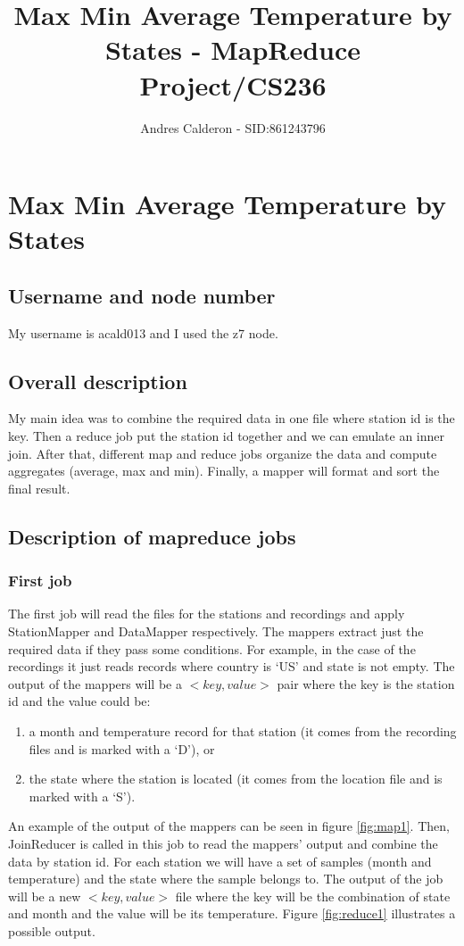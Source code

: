 \documentclass[10pt]{scrartcl}
\title{Max Min Average Temperature by States - MapReduce Project/CS236}
\author{Andres Calderon - SID:861243796}
\begin{document}
\maketitle
\section{Max Min Average Temperature by States}

\subsection{Username and node number}
My username is acald013 and I used the z7 node.

\subsection{Overall description}
My main idea was to combine the required data in one file where station id is the key. Then a reduce job put the station id together and we can emulate an inner join.  After that, different map and reduce jobs organize the data and compute aggregates (average, max and min).  Finally, a mapper will format and sort the final result.

\subsection{Description of mapreduce jobs}
\subsubsection{First job}\label{sec:first-job}
The first job will read the files for the stations and recordings and apply StationMapper and DataMapper respectively. The mappers extract just the required data if they pass some conditions.  For example, in the case of the recordings it just reads records where country is `US' and state is not empty.  The output of the mappers will be a $<key, value>$ pair where the key is the station id and the value could be:
\begin{enumerate}
 \item a month and temperature record for that station (it comes from the recording files and is marked with a `D'), or
 \item the state where the station is located (it comes from the location file and is marked with a `S').
\end{enumerate}

An example of the output of the mappers can be seen in figure \ref{fig:map1}.  Then, JoinReducer is called in this job to read the mappers' output and combine the data by station id. For each station we will have a set of samples (month and temperature) and the state where the sample belongs to. The output of the job will be a new $<key, value>$ file where the key will be the combination of state and month and the value will be its temperature. Figure \ref{fig:reduce1} illustrates a possible output.  
\end{document}
